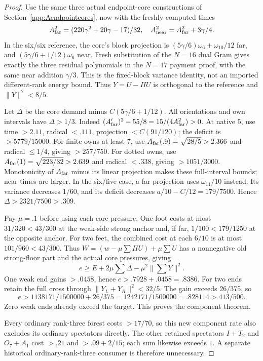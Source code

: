\documentclass[11pt]{article}
\theoremstyle{definition}
\theoremstyle{remark}
\newcommand{\norm}[1]{\lVert #1\rVert}
\begin{document}
\begin{proof}
Use the same three actual endpoint-core
constructions of
Section~\ref{app:Aendpointcores}, now with
the freshly computed times
\[
 A_{\rm far}^2=(220\gamma^2+20\gamma-17)/32,\quad
 A_{\rm near}^2=A_{\rm far}^2+3\gamma/4.
\]
In the six/six reference, the core's block
projection is
\((5\gamma/6)\omega_6+\omega_{10}/12\)
far, and
\((5\gamma/6+1/12)\omega_6\) near.
Fresh substitution of the \(N=16\) dual Gram
gives exactly the three residual polynomials
in the \(N=17\) payment proof, with the
same near addition \(\gamma/3\).
This is the fixed-block variance identity,
not an imported different-rank energy bound.
Thus \(Y=U-\Pi U\) is orthogonal to the
reference and \(\norm Y^2<8/5\).

Let \(\Delta\) be the core demand minus
\(C(5\gamma/6+1/12)\).
All orientations and own intervals have
\(\Delta>1/3\). Indeed
\((A_{\rm far}')^2-55/8=15/(4A_{\rm far}^2)>0\).
At native \(5\), use time \(>2.11\),
radical \(<.111\), projection \(<C(91/120)\);
the deficit is \(>5779/15000\).
For finite owns at least \(7\), use
\(A_{\rm far}(.9)=\sqrt{28/5}>2.366\)
and radical \(\leq1/4\), giving \(>257/750\).
For dotted owns, use
\(A_{\rm far}(1)=\sqrt{223/32}>2.639\)
and radical \(<.338\), giving \(>1051/3000\).
Monotonicity of \(A_{\rm far}\) minus its
linear projection makes these full-interval
bounds; near times are larger.
In the six/five case, a far projection
uses \(\omega_{11}/10\) instead.
Its variance decreases \(1/60\), and
its deficit decreases
\(a/10-C/12=179/7500\).
Hence \(\Delta>2321/7500>.309\).

Pay \(\mu=.1\) before using each core pressure.
One foot costs at most \(31/320<43/300\)
at the weak-side strong anchor and, if far,
\(1/100<179/1250\) at the opposite anchor.
For two feet, the combined cost at each
\(6/10\) is at most \(101/960<43/300\).
Thus \(W=(w-\mu\sum\Pi U)+\mu\sum U\)
has a nonnegative old strong-floor part and
the actual core pressures, giving
\[
 e\geq E+2\mu\sum\Delta-\mu^2\norm{\sum Y}^2.
\]
One weak end gains \(>.0458\), hence
\(e>.7928+.0458=.8386\).
For two ends retain the full cross through
\(\norm{Y_L+Y_R}^2<32/5\).
The gain exceeds \(26/375\), so
\[
 e>1138171/1500000+26/375
   =1242171/1500000=.828114>413/500.
\]
Zero weak ends already exceed the target.
This proves the component theorem.

Every ordinary rank-three forest costs
\(>17/70\), so this new component rate
also excludes its ordinary spectators directly.
The other retained spectators \(I+T_2\)
and \(O_7+A_1\) cost \(>.21\) and
\(>.09+2/15\); each sum likewise exceeds \(1\).
A separate historical ordinary-rank-three
consumer is therefore unnecessary.
\end{proof}
\end{document}
